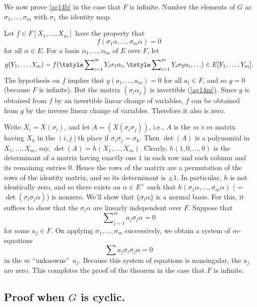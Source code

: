 \documentclass[a4paper,11pt,final,openany]{memoir}
\theoremstyle{nonumberplain}
\begin{document}
We now prove \ref{ag14b} in the case that $F$ is infinite. Number the elements
of $G$ as $\sigma_{1},\ldots,\sigma_{m}$ with $\sigma_{1}$ the identity map.

Let $f\in F[X_{1},\ldots,X_{m}]$ have the property that
\[
f(\sigma_{1}\alpha,\ldots,\sigma_{m}\alpha)=0
\]
for all $\alpha\in E$. For a basis $\alpha_{1},\ldots,\alpha_{m}$ of $E$ over
$F$, let
\[
g(Y_{1},\ldots,Y_{m})=f(\tstyle\sum\nolimits_{i=1}^{m}Y_{i}\sigma_{1}%
\alpha_{i}, \tstyle\sum\nolimits_{i=1}^{m}Y_{i}\sigma_{2}\alpha_{i},\ldots)\in
E[Y_{1},\ldots,Y_{m}]\text{.}%
\]
The hypothesis on $f$ implies that $g(a_{1},\ldots,a_{m})=0$ for all $a_{i}\in
F$, and so $g=0$ (because $F$ is infinite). But the matrix $(\sigma_{i}%
\alpha_{j})$ is invertible (\ref{ag14m}). Since $g$ is obtained from $f$ by an
invertible linear change of variables, $f$ can be obtained from $g$ by the
inverse linear change of variables. Therefore it also is zero.

Write $X_{i}=X(\sigma_{i})$, and let $A=(X(\sigma_{i}\sigma_{j}))$, i.e., $A$
is the $m\times m$ matrix having $X_{k}$ in the $(i,j)$th place if $\sigma
_{i}\sigma_{j}=\sigma_{k}$. Then $\det(A)$ is a polynomial in $X_{1}%
,\ldots,X_{m}$, say, $\det(A)=h(X_{1},\ldots,X_{m})$. Clearly, $h(1,0,\ldots
,0)$ is the determinant of a matrix having exactly one $1$ in each row and
each column and its remaining entries $0$. Hence the rows of the matrix are a
permutation of the rows of the identity matrix, and so its determinant is
$\pm1$. In particular, $h$ is not identically zero, and so there exists an
$\alpha\in E^{\times}$ such that $h(\sigma_{1}\alpha,\ldots,\sigma_{m}\alpha)$
$(=$ $\det(\sigma_{i}\sigma_{j}\alpha)$) is nonzero. We'll show that
$\{\sigma_{i}\alpha\}$ is a normal basis. For this, it suffices to show that
the $\sigma_{i}\alpha$ are linearly independent over $F$. Suppose that
\[
\sum\nolimits_{j=1}^{m}a_{j}\sigma_{j}\alpha=0
\]
for some $a_{j}\in F$. On applying $\sigma_{1},\ldots,\sigma_{m}$
successively, we obtain a system of $m$-equations
\[
\sum a_{j}\sigma_{i}\sigma_{j}\alpha=0
\]
in the $m$ \textquotedblleft unknowns\textquotedblright\ $a_{j}$. Because this
system of equations is nonsingular, the $a_{j}$ are zero. This completes the
proof of the theorem in the case that $F$ is infinite.

\subsection{Proof when $G$ is cyclic.}
\end{document}

